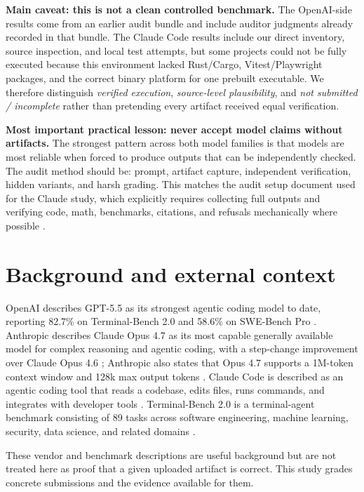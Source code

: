 \documentclass[11pt]{article}
\begin{document}
\textbf{Main caveat: this is not a clean controlled benchmark.}
The OpenAI-side results come from an earlier audit bundle and include auditor judgments already recorded in that bundle. The Claude Code results include our direct inventory, source inspection, and local test attempts, but some projects could not be fully executed because this environment lacked Rust/Cargo, Vitest/Playwright packages, and the correct binary platform for one prebuilt executable. We therefore distinguish \emph{verified execution}, \emph{source-level plausibility}, and \emph{not submitted / incomplete} rather than pretending every artifact received equal verification.

\textbf{Most important practical lesson: never accept model claims without artifacts.}
The strongest pattern across both model families is that models are most reliable when forced to produce outputs that can be independently checked. The audit method should be: prompt, artifact capture, independent verification, hidden variants, and harsh grading. This matches the audit setup document used for the Claude study, which explicitly requires collecting full outputs and verifying code, math, benchmarks, citations, and refusals mechanically where possible \cite{user_claude_audit_setup}.

\section{Background and external context}

OpenAI describes GPT-5.5 as its strongest agentic coding model to date, reporting 82.7\% on Terminal-Bench 2.0 and 58.6\% on SWE-Bench Pro \cite{openai_gpt55}. Anthropic describes Claude Opus 4.7 as its most capable generally available model for complex reasoning and agentic coding, with a step-change improvement over Claude Opus 4.6 \cite{anthropic_models}; Anthropic also states that Opus 4.7 supports a 1M-token context window and 128k max output tokens \cite{anthropic_opus47_whatsnew}. Claude Code is described as an agentic coding tool that reads a codebase, edits files, runs commands, and integrates with developer tools \cite{claude_code_overview}. Terminal-Bench 2.0 is a terminal-agent benchmark consisting of 89 tasks across software engineering, machine learning, security, data science, and related domains \cite{terminalbench_site,merrill2026terminalbench}.

These vendor and benchmark descriptions are useful background but are not treated here as proof that a given uploaded artifact is correct. This study grades concrete submissions and the evidence available for them.
\end{document}

